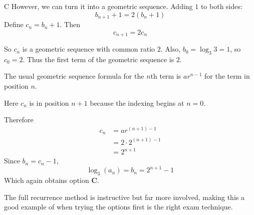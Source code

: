 \documentclass[11pt,a4paper]{article}
\begin{document}
\begin{enumerate}[label=\textbf{\arabic*.},leftmargin=*,itemsep=0pt,start=10]
\begin{djsSolution}{C}
However, we can turn it into a geometric sequence. Adding $1$ to both sides:
\[
b_{n+1}+1=2(b_n+1)
\]
Define $c_n=b_n+1$. Then
\[
c_{n+1}=2c_n
\]

So $c_n$ is a geometric sequence with common ratio $2$. Also, $b_0=\log_3 3=1$, so $c_0=2$. Thus the first term of the geometric sequence is $2$.

The usual geometric sequence formula for the $n$th term is $ar^{n-1}$ for the term in position $n$. 

Here $c_n$ is in position $n+1$ because the indexing begins at $n=0$. 

Therefore
\begin{align*}
    c_n&=ar^{(n+1)-1} \\[5pt]
    &=2\cdot 2^{(n+1)-1}\\[5pt]
    &=2^{n+1}
\end{align*}
Since $b_n=c_n-1$,
\[
\log_3(a_n)=b_n=2^{n+1}-1
\]
Which again obtains option \textbf{C}.

The full recurrence method is instructive but far more involved, making this a good example of when trying the options first is the right exam technique.
\end{djsSolution}
\end{enumerate}
\clearpage
\thispagestyle{djssolutions}
\vspace*{8pt}
\end{document}
